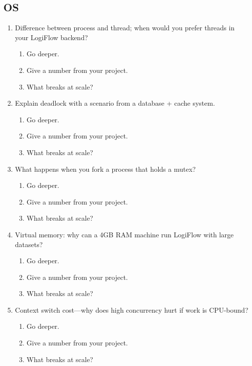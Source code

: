 \documentclass[9pt,a4paper]{article}
\begin{document}
\subsection{OS}
\begin{enumerate}[label=\textbf{Q\arabic*:}, leftmargin=*]
  \item Difference between process and thread; when would you prefer threads in your LogiFlow backend?
  \begin{enumerate}[label=\textit{FU\arabic*:}, leftmargin=2em]
    \item Go deeper.
    \item Give a number from your project.
    \item What breaks at scale?
  \end{enumerate}
  \item Explain deadlock with a scenario from a database + cache system.
  \begin{enumerate}[label=\textit{FU\arabic*:}, leftmargin=2em]
    \item Go deeper.
    \item Give a number from your project.
    \item What breaks at scale?
  \end{enumerate}
  \item What happens when you fork a process that holds a mutex?
  \begin{enumerate}[label=\textit{FU\arabic*:}, leftmargin=2em]
    \item Go deeper.
    \item Give a number from your project.
    \item What breaks at scale?
  \end{enumerate}
  \item Virtual memory: why can a 4GB RAM machine run LogiFlow with large datasets?
  \begin{enumerate}[label=\textit{FU\arabic*:}, leftmargin=2em]
    \item Go deeper.
    \item Give a number from your project.
    \item What breaks at scale?
  \end{enumerate}
  \item Context switch cost---why does high concurrency hurt if work is CPU-bound?
  \begin{enumerate}[label=\textit{FU\arabic*:}, leftmargin=2em]
    \item Go deeper.
    \item Give a number from your project.
    \item What breaks at scale?
  \end{enumerate}
\end{enumerate}
\end{document}
